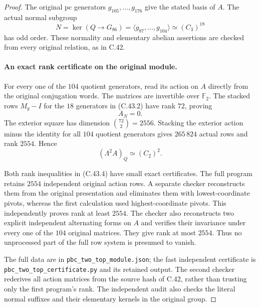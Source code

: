 \begin{proof}
The original pc generators $g_{105},\ldots,g_{176}$ give the stated
basis of $A$.  The actual normal subgroup
\[
       N=\ker(Q\to G_{86})=\langle g_{87},\ldots,g_{104}\rangle
                            \simeq(C_3)^{18}
 \tag{C.43.2}
\]
has odd order.  These normality and elementary abelian assertions
are checked from every original relation, as in C.42.

\paragraph{An exact rank certificate on the original module.}
For every one of the $104$ quotient generators, read its action on
$A$ directly from the original conjugation words.  The matrices
are invertible over $\mathbb F_2$.  The stacked rows $M_g-I$ for
the $18$ generators in (C.43.2) have rank $72$, proving
\[
                              A_N=0.
 \tag{C.43.3}
\]
The exterior square has dimension $\binom{72}{2}=2556$.
Stacking the exterior action minus the identity for all $104$
quotient generators gives $265\,824$ actual rows and rank $2554$.
Hence
\[
                       (\Lambda^2A)_Q\simeq(C_2)^2.
 \tag{C.43.4}
\]

Both rank inequalities in (C.43.4) have small exact certificates.
The full program retains $2554$ independent original action rows.
A separate checker reconstructs them from the original presentation
and eliminates them with lowest-coordinate pivots, whereas the first
calculation used highest-coordinate pivots.  This independently
proves rank at least $2554$.  The checker also reconstructs two
explicit independent alternating forms on $A$ and verifies their
invariance under every one of the $104$ original matrices.  They
give rank at most $2554$.  Thus no unprocessed part of the full
row system is presumed to vanish.

The full data are in
\texttt{pbc\_two\_top\_module.json}; the fast independent
certificate is
\texttt{pbc\_two\_top\_certificate.py} and its retained output.
The second checker rederives all action matrices from the source
hash of C.42, rather than trusting only the first program's rank.
The independent audit also checks the literal normal suffixes and
their elementary kernels in the original group.


\end{proof}
